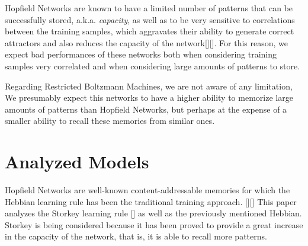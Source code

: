 \documentclass[anon]{CI}
\begin{document}
Hopfield Networks are known to have a limited number of patterns that can be successfully stored, a.k.a. \emph{capacity}, as well as to be very sensitive to correlations between the training samples, which aggravates their ability to generate correct attractors and also reduces the capacity of the network[\cite{hopfield1982neural}][\cite{Storkey1997}]. For this reason, we expect bad performances of these networks both when considering training samples very correlated and when considering large amounts of patterns to store.

Regarding Restricted Boltzmann Machines, we are not aware of any limitation, We presumably expect this networks to have a higher ability to memorize large amounts of patterns than Hopfield Networks, but perhaps at the expense of a smaller ability to recall these memories from similar ones.



\section{Analyzed Models}

Hopfield Networks are well-known content-addressable memories for which the Hebbian learning rule has been the traditional training approach. [\cite{hopfield1982neural}][\cite{Hebb1950}] This paper analyzes the Storkey learning rule [\cite{Storkey1997}] as well as the previously mentioned Hebbian. Storkey is being considered because it has been proved to provide a great increase in the capacity of the network, that is, it is able to recall more patterns.
\end{document}
